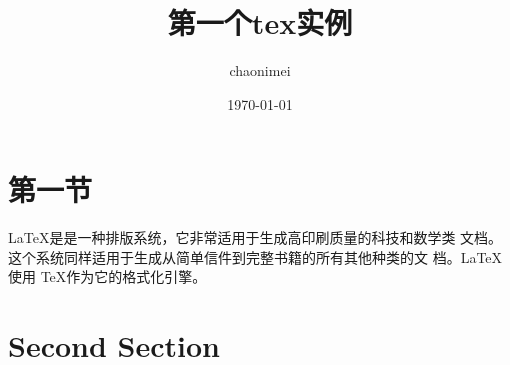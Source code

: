 \documentclass[UTF-8]{ctexart}
\title{第一个tex实例}
\author{chaonimei}
\date{\today}
\begin{document}
\maketitle
\tableofcontents
\section{第一节}
\LaTeX 是是一种排版系统，它非常适用于生成高印刷质量的科技和数学类
文档。这个系统同样适用于生成从简单信件到完整书籍的所有其他种类的文
档。\LaTeX 使用 \TeX 作为它的格式化引擎。
 

\section{Second Section}
\end{document}
